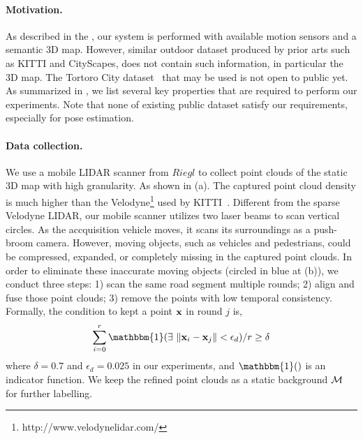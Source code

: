 \paragraph{Motivation.}
As described in the , our system is performed with available motion sensors and a semantic 3D map.
However, similar outdoor dataset produced by prior arts such as KITTI and CityScapes, does not contain such information, in particular the 3D map. The Tortoro City dataset~\cite{wang2016torontocity} that may be used is not open to public yet. As summarized in , we list several key properties that are required to perform our experiments.
Note that none of existing public dataset satisfy our requirements, especially for pose estimation. 

\paragraph{Data collection.}
We use a mobile LIDAR scanner from $Riegl$ to collect point clouds of the static 3D map with high granularity. As shown in (a). The captured point cloud density is much higher than the Velodyne\footnote{http://www.velodynelidar.com/} used by KITTI~\cite{geiger2012we}.
Different from the sparse Velodyne LIDAR, our mobile scanner utilizes two laser beams to scan vertical circles. As the accquisition vehicle moves, it scans its surroundings as a push-broom camera. However, moving objects, such as vehicles and pedestrians, could be compressed, expanded, or completely missing in the captured point clouds.
In order to eliminate these inaccurate moving objects (circled in blue at (b)), we conduct three steps:
1) scan the same road segment multiple rounds; 2) align and fuse those point clouds; 3) remove the points with low temporal consistency.
Formally, the condition to kept a point ${\mathbf x}$ in round $j$ is,
\begin{align}
\sum_{i=0}^{r}{\mathbbm{1}(\exists~\|\ve{x}_i - \ve{x}_j\| < \epsilon_d )} / r \geq \delta
\end{align}
where $\delta = 0.7$ and $\epsilon_d = 0.025$ in our experiments, and $\mathbbm{1}()$ is an indicator function. 
We keep the refined point clouds as a static background ${\mathcal M}$ for further labelling.

